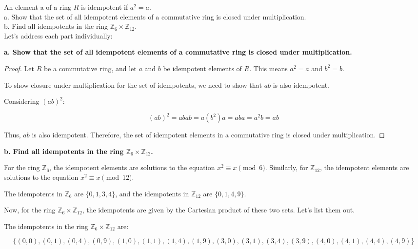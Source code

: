 \documentclass[12pt]{amsart}
\theoremstyle{definition}
\numberwithin{equation}{section}
\theoremstyle{plain}
\newcommand{\Z}{\mathbb{Z}}
\begin{document}
\begin{exercise}{44} 
    An element a of a ring $R$ is idempotent if $a^2 = a$.\\
    a. Show that the set of all idempotent elements of a commutative ring is closed under multiplication.\\
    b. Find all idempotents in the ring $\Z_6 \times \Z_{12}$.\\

    
    Let's address each part individually:

\textbf{a. Show that the set of all idempotent elements of a commutative ring is closed under multiplication.}

\begin{proof}
Let \( R \) be a commutative ring, and let \( a \) and \( b \) be idempotent elements of \( R \). This means \( a^2 = a \) and \( b^2 = b \).

To show closure under multiplication for the set of idempotents, we need to show that \( ab \) is also idempotent.

Considering \( (ab)^2 \):

\[ (ab)^2 = abab = a(b^2)a = aba = a^2b = ab \]

Thus, \( ab \) is also idempotent. Therefore, the set of idempotent elements in a commutative ring is closed under multiplication.
\end{proof}

\textbf{b. Find all idempotents in the ring \( \Z_6 \times \Z_{12} \).}

For the ring \( \Z_6 \), the idempotent elements are solutions to the equation \( x^2 \equiv x \pmod{6} \). Similarly, for \( \Z_{12} \), the idempotent elements are solutions to the equation \( x^2 \equiv x \pmod{12} \).

The idempotents in \( \Z_6 \) are \( \{0, 1, 3, 4\} \), and the idempotents in \( \Z_{12} \) are \( \{0, 1, 4, 9\} \).

Now, for the ring \( \Z_6 \times \Z_{12} \), the idempotents are given by the Cartesian product of these two sets. Let's list them out.

The idempotents in the ring \( \Z_6 \times \Z_{12} \) are:

\[
\{(0, 0), (0, 1), (0, 4), (0, 9), (1, 0), (1, 1), (1, 4), (1, 9), (3, 0), (3, 1), (3, 4), (3, 9), (4, 0), (4, 1), (4, 4), (4, 9)\}
\]
\end{exercise}
\vspace*{20pt}
\end{document}
